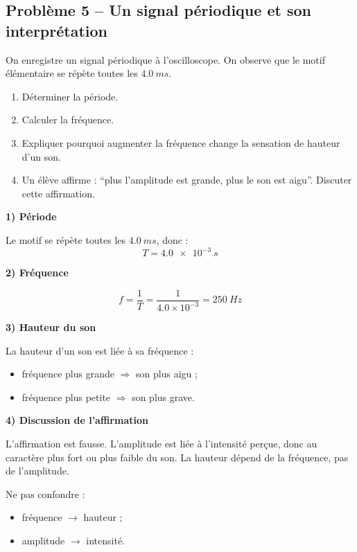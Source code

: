 \documentclass[11pt,a4paper]{article}
\begin{document}
\subsection{Problème 5 -- Un signal périodique et son interprétation}

\begin{enoncebox}
On enregistre un signal périodique à l'oscilloscope.  
On observe que le motif élémentaire se répète toutes les \(\SI{4.0}{ms}\).

\begin{enumerate}[label=\arabic*)]
    \item Déterminer la période.
    \item Calculer la fréquence.
    \item Expliquer pourquoi augmenter la fréquence change la sensation de hauteur d'un son.
    \item Un élève affirme : ``plus l'amplitude est grande, plus le son est aigu''. Discuter cette affirmation.
\end{enumerate}
\end{enoncebox}

\begin{corrigebox}
\textbf{1) Période}

Le motif se répète toutes les \(\SI{4.0}{ms}\), donc :
\[
T = \SI{4.0e-3}{s}
\]

\textbf{2) Fréquence}

\[
f = \frac{1}{T} = \frac{1}{4.0\times 10^{-3}} = \SI{250}{Hz}
\]

\textbf{3) Hauteur du son}

La hauteur d'un son est liée à sa fréquence :
\begin{itemize}
    \item fréquence plus grande \(\Rightarrow\) son plus aigu ;
    \item fréquence plus petite \(\Rightarrow\) son plus grave.
\end{itemize}

\textbf{4) Discussion de l'affirmation}

L'affirmation est fausse.  
L'amplitude est liée à l'intensité perçue, donc au caractère plus fort ou plus faible du son.  
La hauteur dépend de la fréquence, pas de l'amplitude.

\begin{attentionbox}
Ne pas confondre :
\begin{itemize}
    \item fréquence \(\rightarrow\) hauteur ;
    \item amplitude \(\rightarrow\) intensité.
\end{itemize}
\end{attentionbox}
\end{corrigebox}
\end{document}

